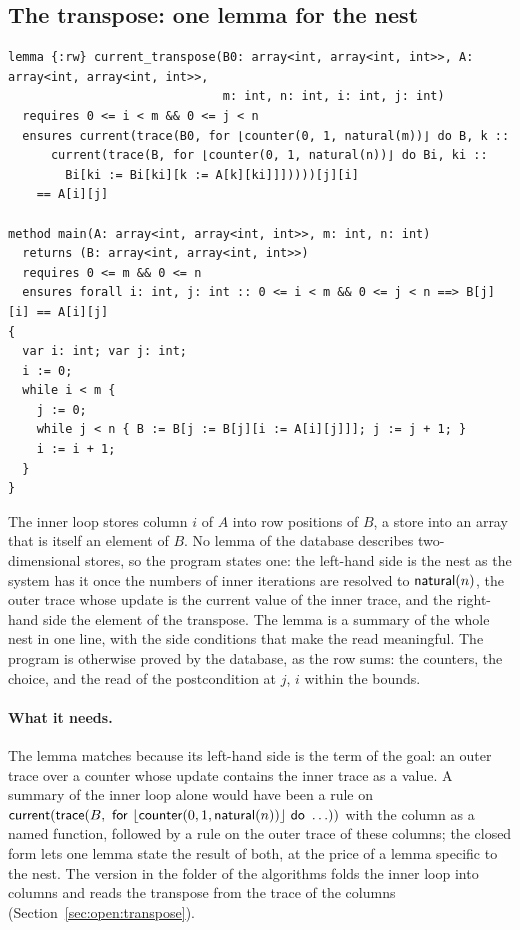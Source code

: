 \subsection{The transpose: one lemma for the nest}\label{sec:transpose}
\begin{lstlisting}
lemma {:rw} current_transpose(B0: array<int, array<int, int>>, A: array<int, array<int, int>>,
                              m: int, n: int, i: int, j: int)
  requires 0 <= i < m && 0 <= j < n
  ensures current(trace(B0, for ⌊counter(0, 1, natural(m))⌋ do B, k ::
      current(trace(B, for ⌊counter(0, 1, natural(n))⌋ do Bi, ki ::
        Bi[ki := Bi[ki][k := A[k][ki]]]))))[j][i]
    == A[i][j]

method main(A: array<int, array<int, int>>, m: int, n: int)
  returns (B: array<int, array<int, int>>)
  requires 0 <= m && 0 <= n
  ensures forall i: int, j: int :: 0 <= i < m && 0 <= j < n ==> B[j][i] == A[i][j]
{
  var i: int; var j: int;
  i := 0;
  while i < m {
    j := 0;
    while j < n { B := B[j := B[j][i := A[i][j]]]; j := j + 1; }
    i := i + 1;
  }
}
\end{lstlisting}
The inner loop stores column $i$ of $A$ into row positions of $B$, a store into an array that is itself an
element of $B$. No lemma of the database describes two-dimensional stores, so the program states one: the left-hand
side is the nest as the system has it once the numbers of inner iterations are resolved to $\mathsf{natural}(n)$, the outer
trace whose update is the current value of the inner trace, and the right-hand side the element of the transpose.
The lemma is a summary of the whole nest in one line, with the side conditions that make the read meaningful.
The program is otherwise proved by the database, as the row sums: the counters, the choice, and the read of the
postcondition at $j$, $i$ within the bounds.

\paragraph{What it needs.} The lemma matches because its left-hand side is the term of the goal: an outer trace
over a counter whose update contains the inner trace as a value. A summary of the inner loop alone would have
been a rule on $\mathsf{current}(\mathsf{trace}(B,\ \mathsf{for}\ \lfloor \mathsf{counter}(0, 1, \mathsf{natural}(n))\rfloor\ \mathsf{do}\ \ldots))$ with the column as a named function, followed by
a rule on the outer trace of these columns; the closed form lets one lemma state the result of both, at the
price of a lemma specific to the nest. The version in the folder of the algorithms folds the inner loop into
columns and reads the transpose from the trace of the columns (Section~\ref{sec:open:transpose}).
